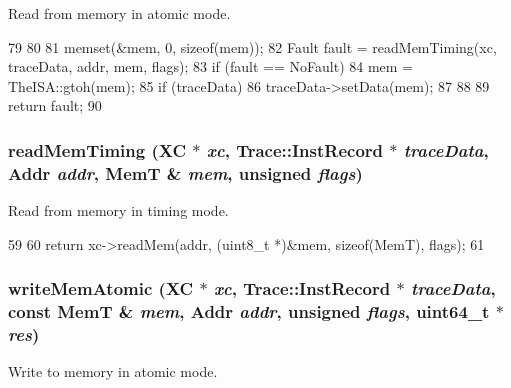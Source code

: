 Read from memory in atomic mode. 


\begin{DoxyCode}
79 {
80 
81     memset(&mem, 0, sizeof(mem));
82     Fault fault = readMemTiming(xc, traceData, addr, mem, flags);
83     if (fault == NoFault) {
84         mem = TheISA::gtoh(mem);
85         if (traceData)
86             traceData->setData(mem);
87     }
88    
89     return fault;
90 }
\end{DoxyCode}
\hypertarget{generic_2memhelpers_8hh_a491fe4bf4be9d7fed3785c1ae563ff5d}{
\subsubsection[{readMemTiming}]{ readMemTiming (XC $\ast$ {\em xc}, \/  {\bf Trace::InstRecord} $\ast$ {\em traceData}, \/  {\bf Addr} {\em addr}, \/  MemT \& {\em mem}, \/  unsigned {\em flags})}}
\label{generic_2memhelpers_8hh_a491fe4bf4be9d7fed3785c1ae563ff5d}


Read from memory in timing mode. 


\begin{DoxyCode}
59 {
60     return xc->readMem(addr, (uint8_t *)&mem, sizeof(MemT), flags);
61 }
\end{DoxyCode}
\hypertarget{generic_2memhelpers_8hh_a806e635999838018e8f1e2b84e9cb827}{
\subsubsection[{writeMemAtomic}]{ writeMemAtomic (XC $\ast$ {\em xc}, \/  {\bf Trace::InstRecord} $\ast$ {\em traceData}, \/  const MemT \& {\em mem}, \/  {\bf Addr} {\em addr}, \/  unsigned {\em flags}, \/  uint64\_\-t $\ast$ {\em res})}}
\label{generic_2memhelpers_8hh_a806e635999838018e8f1e2b84e9cb827}


Write to memory in atomic mode. 


